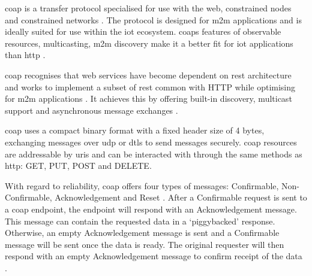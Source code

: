 \acrfull{coap} is a transfer protocol specialised for use with the web, constrained
nodes and constrained networks \citep{shelby_constrained_2014}. The protocol is 
designed for \gls{m2m} applications and is ideally suited for use within the 
\gls{iot} ecosystem. \glspl{coap} features of observable resources, multicasting, \gls{m2m} discovery 
make it a better fit for \gls{iot} applications than \gls{http} \citep{kovatsch_californium_2014}.

\gls{coap} recognises that web services have become dependent on \gls{rest} 
architecture and works to implement a subset of \gls{rest} common with HTTP while
optimising for \gls{m2m} applications \citep{shelby_constrained_2014}. It achieves 
this by offering built-in discovery, multicast support and asynchronous message 
exchanges \citep{shelby_constrained_2014}. 

\gls{coap} uses a compact binary format with a fixed header size of 4 bytes, 
exchanging messages over \gls{udp} or \gls{dtls} to send messages securely. \gls{coap} 
resources are addressable by \glspl{uri} and can be interacted with through the 
same methods as \gls{http}: GET, PUT, POST and DELETE.

With regard to reliability, \gls{coap} offers four types of messages: Confirmable, 
Non-Confirmable, Acknowledgement and Reset \citep{bellavista_towards_2016}.
After a Confirmable request is sent to a \gls{coap} endpoint, the endpoint will 
respond with an Acknowledgement message. This message can contain the requested 
data in a `piggybacked' response. Otherwise, an empty Acknowledgement message is sent 
and a Confirmable message will be sent once the data is ready. The original
requester will then respond with an empty Acknowledgement message to confirm receipt 
of the data \citep{shelby_constrained_2014}.
